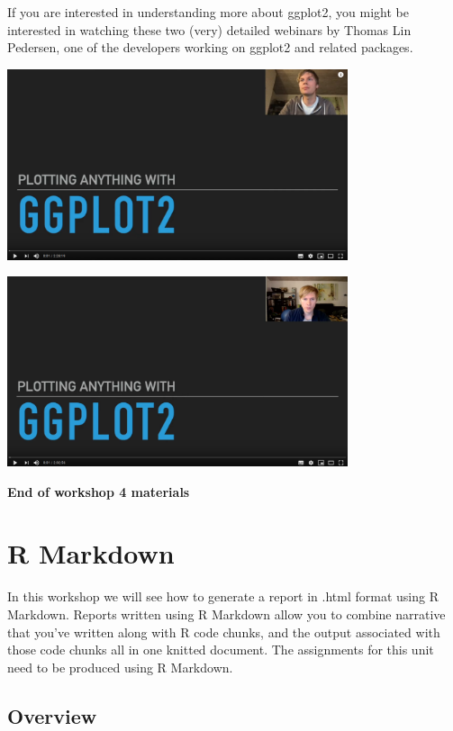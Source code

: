 \documentclass[
]{book}
\begin{document}
If you are interested in understanding more about ggplot2, you might be interested in watching these two (very) detailed webinars by Thomas Lin Pedersen, one of the developers working on ggplot2 and related packages.

\href{https://youtu.be/h29g21z0a68}{\includegraphics[width=0.75\textwidth,height=\textheight]{images/ggplot2_pt1.png}}

\href{https://youtu.be/0m4yywqNPVY}{\includegraphics[width=0.75\textwidth,height=\textheight]{images/ggplot2_pt2.png}}

\textbf{End of workshop 4 materials}

\hypertarget{r-markdown}{%
\chapter{R Markdown}\label{r-markdown}}

In this workshop we will see how to generate a report in .html format using R Markdown. Reports written using R Markdown allow you to combine narrative that you've written along with R code chunks, and the output associated with those code chunks all in one knitted document. The assignments for this unit need to be produced using R Markdown.

\hypertarget{overview}{%
\section{Overview}\label{overview}}
\end{document}
